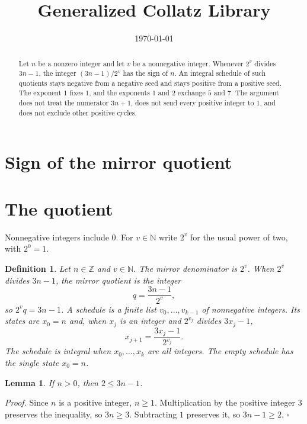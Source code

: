 \documentclass[11pt,letterpaper]{article}
\title{Generalized Collatz Library}
\author{}
\date{\today}
\newcommand{\N}{\mathbb{N}}
\newcommand{\Z}{\mathbb{Z}}
\newtheorem{lemma}[theorem]{Lemma}
\newtheorem{definition}[theorem]{Definition}
\newenvironment{proof}{\noindent\textit{Proof.}}{\hfill\(\square\)}
\begin{document}
\maketitle
\section*{Sign of the mirror quotient}

\begin{abstract}
Let \(n\) be a nonzero integer and let \(v\) be a nonnegative integer. Whenever \(2^{v}\) divides \(3n-1\), the integer \((3n-1)/2^{v}\) has the sign of \(n\). An integral schedule of such quotients stays negative from a negative seed and stays positive from a positive seed. The exponent \(1\) fixes \(1\), and the exponents \(1\) and \(2\) exchange \(5\) and \(7\). The argument does not treat the numerator \(3n+1\), does not send every positive integer to \(1\), and does not exclude other positive cycles.
\end{abstract}

\section{The quotient}

Nonnegative integers include \(0\). For \(v\in\N\) write \(2^{v}\) for the usual power of two, with \(2^{0}=1\).

\begin{definition}
\label{def:mirror}
Let \(n\in\Z\) and \(v\in\N\). The \emph{mirror denominator} is \(2^{v}\). When \(2^{v}\) divides \(3n-1\), the \emph{mirror quotient} is the integer
\[
q=\frac{3n-1}{2^{v}},
\]
so \(2^{v}q=3n-1\). A \emph{schedule} is a finite list \(v_{0},\ldots,v_{k-1}\) of nonnegative integers. Its states are \(x_{0}=n\) and, when \(x_{j}\) is an integer and \(2^{v_{j}}\) divides \(3x_{j}-1\),
\[
x_{j+1}=\frac{3x_{j}-1}{2^{v_{j}}}.
\]
The schedule is \emph{integral} when \(x_{0},\ldots,x_{k}\) are all integers. The empty schedule has the single state \(x_{0}=n\).
\end{definition}

\begin{lemma}
\label{lem:numerator-positive}
If \(n>0\), then \(2\le 3n-1\).
\end{lemma}

\begin{proof}
Since \(n\) is a positive integer, \(n\ge 1\). Multiplication by the positive integer \(3\) preserves the inequality, so \(3n\ge 3\). Subtracting \(1\) preserves it, so \(3n-1\ge 2\).
\end{proof}
\end{document}
